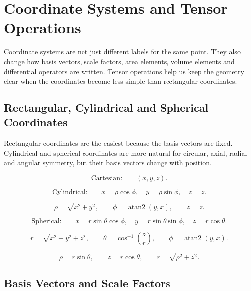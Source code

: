\documentclass{otscience}
\begin{document}
\maketitle
\tableofcontents
\newpage
\fi

\section{Coordinate Systems and Tensor Operations}

Coordinate systems are not just different labels for the same point. They also change how basis vectors, scale factors, area elements, volume elements and differential operators are written. Tensor operations help us keep the geometry clear when the coordinates become less simple than rectangular coordinates.

\subsection{Rectangular, Cylindrical and Spherical Coordinates}

Rectangular coordinates are the easiest because the basis vectors are fixed. Cylindrical and spherical coordinates are more natural for circular, axial, radial and angular symmetry, but their basis vectors change with position.

\begin{formulabox}
    \[
        \text{Cartesian:}\qquad (x,y,z).
    \]

    \[
        \text{Cylindrical:}\qquad x=\rho\cos\phi,\quad y=\rho\sin\phi,\quad z=z.
    \]

    \[
        \rho=\sqrt{x^2+y^2},\qquad \phi=\operatorname{atan2}(y,x),\qquad z=z.
    \]

    \[
        \text{Spherical:}\qquad x=r\sin\theta\cos\phi,
        \quad y=r\sin\theta\sin\phi,
        \quad z=r\cos\theta.
    \]

    \[
        r=\sqrt{x^2+y^2+z^2},\qquad
        \theta=\cos^{-1}\left(\frac{z}{r}\right),\qquad
        \phi=\operatorname{atan2}(y,x).
    \]

    \[
        \rho=r\sin\theta,
        \qquad z=r\cos\theta,
        \qquad r=\sqrt{\rho^2+z^2}.
    \]
\end{formulabox}

\subsection{Basis Vectors and Scale Factors}
\end{document}
